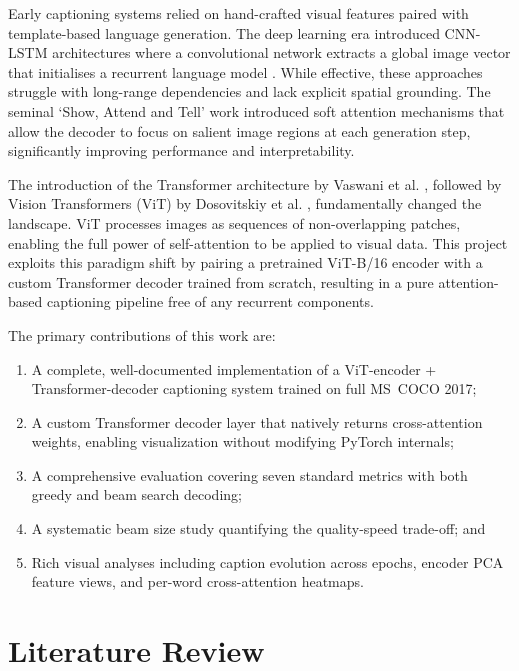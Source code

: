 \documentclass[conference]{IEEEtran}
\begin{document}
Early captioning systems relied on hand-crafted visual features paired with template-based language generation. The deep learning era introduced CNN-LSTM architectures where a convolutional network extracts a global image vector that initialises a recurrent language model \cite{vinyals2015show}. While effective, these approaches struggle with long-range dependencies and lack explicit spatial grounding. The seminal `Show, Attend and Tell' work \cite{xu2015show} introduced soft attention mechanisms that allow the decoder to focus on salient image regions at each generation step, significantly improving performance and interpretability.

The introduction of the Transformer architecture by Vaswani et al. \cite{vaswani2017attention}, followed by Vision Transformers (ViT) by Dosovitskiy et al. \cite{dosovitskiy2020image}, fundamentally changed the landscape. ViT processes images as sequences of non-overlapping patches, enabling the full power of self-attention to be applied to visual data. This project exploits this paradigm shift by pairing a pretrained ViT-B/16 encoder with a custom Transformer decoder trained from scratch, resulting in a pure attention-based captioning pipeline free of any recurrent components.

The primary contributions of this work are:
\begin{enumerate}
    \item A complete, well-documented implementation of a ViT-encoder + Transformer-decoder captioning system trained on full MS~COCO 2017;
    \item A custom Transformer decoder layer that natively returns cross-attention weights, enabling visualization without modifying PyTorch internals;
    \item A comprehensive evaluation covering seven standard metrics with both greedy and beam search decoding;
    \item A systematic beam size study quantifying the quality-speed trade-off; and
    \item Rich visual analyses including caption evolution across epochs, encoder PCA feature views, and per-word cross-attention heatmaps.
\end{enumerate}

\section{Literature Review}
\end{document}
